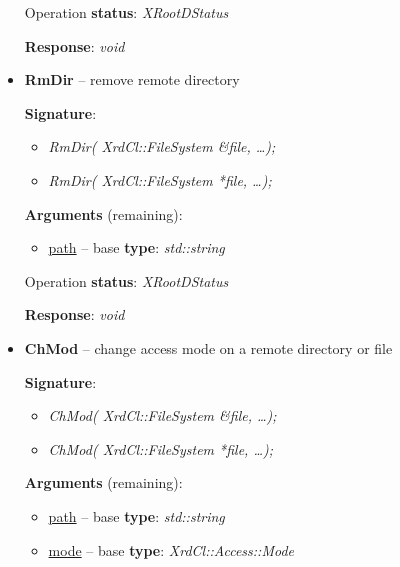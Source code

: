 \documentclass{article}
\begin{document}
\begin{itemize}
\begin{samepage}
                    Operation \textbf{status}: \textit{XRootDStatus}

                    \textbf{Response}: \textit{void}
                    
                \end{samepage}
                    
                \item \begin{samepage} \textbf{RmDir} -- remove remote directory

                    \textbf{Signature}:
                    \begin{itemize}
                        \item \textit{RmDir( XrdCl::FileSystem \&file, \ldots);}
                        \item \textit{RmDir( XrdCl::FileSystem *file, \ldots );}
                    \end{itemize}

                    \textbf{Arguments} (remaining):
                    \begin{itemize}
                        \item \underline{path} -- base \textbf{type}: \textit{std::string}
                    \end{itemize}

                    Operation \textbf{status}: \textit{XRootDStatus}

                    \textbf{Response}: \textit{void}
                    
                \end{samepage}
                    
                \item \begin{samepage} \textbf{ChMod} -- change access mode on a remote directory or file

                    \textbf{Signature}:
                    \begin{itemize}
                        \item \textit{ChMod( XrdCl::FileSystem \&file, \ldots);}
                        \item \textit{ChMod( XrdCl::FileSystem *file, \ldots );}
                    \end{itemize}

                    \textbf{Arguments} (remaining):
                    \begin{itemize}
                        \item \underline{path} -- base \textbf{type}: \textit{std::string}
                        \item \underline{mode} -- base \textbf{type}: \textit{XrdCl::Access::Mode}
                    \end{itemize}


\end{samepage}
\end{itemize}
\end{document}
